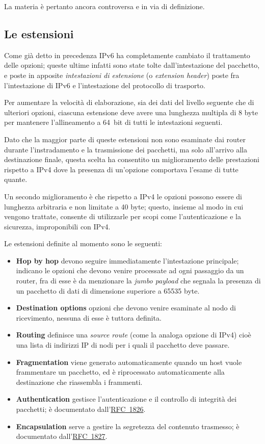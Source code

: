 La materia è pertanto ancora controversa e in via di definizione.


\subsection{Le estensioni}
\label{sec:IP_ipv6_extens}

Come già detto in precedenza IPv6 ha completamente cambiato il trattamento
delle opzioni; queste ultime infatti sono state tolte dall'intestazione del
pacchetto, e poste in apposite \textsl{intestazioni di estensione} (o
\textit{extension header}) poste fra l'intestazione di IPv6 e l'intestazione
del protocollo di trasporto.

Per aumentare la velocità di elaborazione, sia dei dati del livello seguente
che di ulteriori opzioni, ciascuna estensione deve avere una lunghezza
multipla di 8 byte per mantenere l'allineamento a 64~bit di tutti le
intestazioni seguenti.

Dato che la maggior parte di queste estensioni non sono esaminate dai router
durante l'instradamento e la trasmissione dei pacchetti, ma solo all'arrivo
alla destinazione finale, questa scelta ha consentito un miglioramento delle
prestazioni rispetto a IPv4 dove la presenza di un'opzione comportava l'esame
di tutte quante.

Un secondo miglioramento è che rispetto a IPv4 le opzioni possono essere di
lunghezza arbitraria e non limitate a 40 byte; questo, insieme al modo in cui
vengono trattate, consente di utilizzarle per scopi come l'autenticazione e la
sicurezza, improponibili con IPv4.

Le estensioni definite al momento sono le seguenti:
\begin{itemize}
\item \textbf{Hop by hop} devono seguire immediatamente l'intestazione
  principale; indicano le opzioni che devono venire processate ad ogni
  passaggio da un router, fra di esse è da menzionare la \textit{jumbo
    payload} che segnala la presenza di un pacchetto di dati di dimensione
  superiore a 65535 byte.
\item \textbf{Destination options} opzioni che devono venire esaminate al nodo
  di ricevimento, nessuna di esse è tuttora definita.
\item \textbf{Routing} definisce una \textit{source route} (come la analoga
  opzione di IPv4) cioè una lista di indirizzi IP di nodi per i quali il
  pacchetto deve passare. 
\item \textbf{Fragmentation} viene generato automaticamente quando un host
  vuole frammentare un pacchetto, ed è riprocessato automaticamente alla
  destinazione che riassembla i frammenti.
\item \textbf{Authentication} gestisce l'autenticazione e il controllo di
  integrità dei pacchetti; è documentato
  dall'\href{http://www.ietf.org/rfc/rfc1826.txt}{RFC~1826}.
\item \textbf{Encapsulation} serve a gestire la segretezza del contenuto
  trasmesso; è documentato
  dall'\href{http://www.ietf.org/rfc/rfc1827.txt}{RFC~1827}.
\end{itemize}

